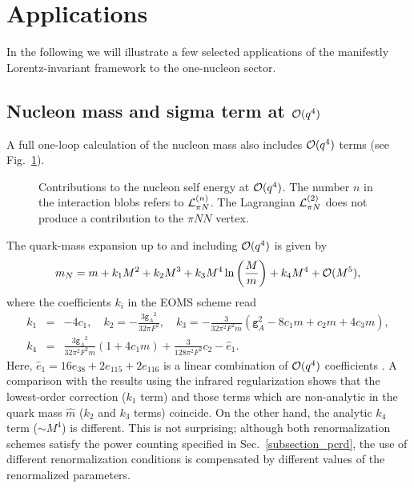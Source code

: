 \documentclass[twoside,12pt]{article}
\begin{document}
\section{Applications}
\label{section_applications}
   In the following we will illustrate a few selected applications
of the manifestly Lorentz-invariant framework to the one-nucleon sector.

\subsection{Nucleon mass and sigma term at ${\cal O}(q^4)$}
   A full one-loop calculation of the nucleon mass also includes
${\cal O}(q^4)$ terms (see Fig.~\ref{5:1:1:SEDiagrams}).
\begin{figure}[t]
\begin{center}
\caption{\label{5:1:1:SEDiagrams}
Contributions to the nucleon self energy at ${\cal O}(q^4)$.
The number $n$ in the interaction blobs refers to ${\cal L}_{\pi N}^{(n)}$.
The Lagrangian ${\cal L}_{\pi N}^{(2)}$ does not produce a contribution to the $\pi NN$ vertex.}
\end{center}
\end{figure}
   The quark-mass expansion up to and including ${\cal O}(q^4)$ is given by
\begin{equation}
\label{mnoq4}
m_N=m+k_1 M^2+k_2 M^3+k_3 M^4\ln\left(\frac{M}{m}\right)+k_4 M^4
+{\cal O}(M^5),
\end{equation}
where the coefficients $k_i$ in the EOMS scheme read \cite{Fuchs:2003qc}
\begin{eqnarray}
\label{parki}
k_1&=&-4 c_1,\quad
k_2=-\frac{3 {\texttt{g}_A}^2}{32\pi F^2},\quad
k_3=-\frac{3}{32\pi^2 F^2 m}\left(\texttt{g}_A^2-8c_1m+c_2m+4 c_3m\right),
\nonumber\\
k_4&=&\frac{3 {\texttt{g}_A}^2}{32 \pi^2 F^2 m}(1+4 c_1 m)
+\frac{3}{128\pi^2F^2}c_2-\hat{e}_1.
\end{eqnarray}
   Here, $\hat{e}_1= 16 e_{38}+2e_{115}+2e_{116}$ is a linear combination
of ${\cal O}(q^4)$ coefficients \cite{Fettes:2000gb}.
   A comparison with the results using the infrared regularization \cite{Becher:1999he}
shows that the lowest-order correction ($k_1$ term) and those terms which are non-analytic
in the quark mass $\hat{m}$ ($k_2$ and $k_3$ terms) coincide.
   On the other hand, the analytic $k_4$ term ($\sim M^4$) is different.
   This is not surprising; although both renormalization schemes satisfy
the power counting specified in Sec.~\ref{subsection_pcrd},
the use of different renormalization conditions is compensated by different
values of the renormalized parameters.
\end{document}
